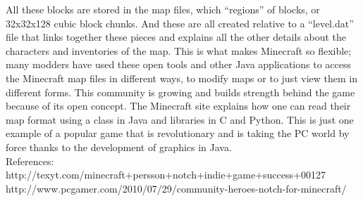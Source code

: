 \documentclass[11pt]{article}
\begin{document}
All these blocks are stored in the map files, which ``regions'' of blocks, or 32x32x128 cubic block chunks. And these are all created relative to a ``level.dat'' file that links together these pieces and explains all the other details about the characters and inventories of the map. This is what makes Minecraft so flexible; many modders have used these open tools and other Java applications to access the Minecraft map files in different ways, to modify maps or to just view them in different forms. This community is growing and builds strength behind the game because of its open concept. The Minecraft site explains how one can read their map format using a class in Java and libraries in C and Python. This is just one example of a popular game that is revolutionary and is taking the PC world by force thanks to the development of graphics in Java.\\


References:\\
http://texyt.com/minecraft+persson+notch+indie+game+success+00127 \\
http://www.pcgamer.com/2010/07/29/community-heroes-notch-for-minecraft/
\end{document}
